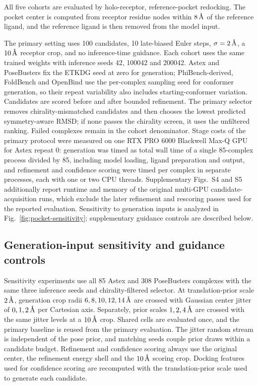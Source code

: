 \documentclass{article}
\newcommand{\angstrom}{\text{\normalfont\AA}}
\begin{document}
All five cohorts are evaluated by holo-receptor, reference-pocket redocking.
The pocket center is computed from receptor residue nodes within \(8\,\angstrom\) of the reference ligand, and the reference ligand is then removed from the model input.

The primary setting uses 100 candidates, 10 late-biased Euler steps, \(\sigma=2\,\angstrom\), a \(10\,\angstrom\) receptor crop, and no inference-time guidance.
Each cohort uses the same trained weights with inference seeds 42, 100042 and 200042. Astex and PoseBusters fix the ETKDG seed at zero for generation; PhiBench-derived, FoldBench and OpenBind use the per-complex sampling seed for conformer generation, so their repeat variability also includes starting-conformer variation.
Candidates are scored before and after bounded refinement.
The primary selector removes chirality-mismatched candidates and then chooses the lowest predicted symmetry-aware RMSD; if none passes the chirality screen, it uses the unfiltered ranking.
Failed complexes remain in the cohort denominator.
Stage costs of the primary protocol were measured on one RTX PRO 6000 Blackwell Max-Q GPU for Astex repeat 0: generation was timed as total wall time of a single 85-complex process divided by 85, including model loading, ligand preparation and output, and refinement and confidence scoring were timed per complex in separate processes, each with one or two CPU threads. Supplementary Figs.~S4 and S5 additionally report runtime and memory of the original multi-GPU candidate-acquisition runs, which exclude the later refinement and rescoring passes used for the reported evaluation. Sensitivity to generation inputs is analyzed in Fig.~\ref{fig:pocket-sensitivity}; supplementary guidance controls are described below.

\subsection{Generation-input sensitivity and guidance controls}

Sensitivity experiments use all 85 Astex and 308 PoseBusters complexes with the same three inference seeds and chirality-filtered selector. At translation-prior scale \(2\,\angstrom\), generation crop radii \(6,8,10,12,14\,\angstrom\) are crossed with Gaussian center jitter of \(0,1,2\,\angstrom\) per Cartesian axis. Separately, prior scales \(1,2,4\,\angstrom\) are crossed with the same jitter levels at a \(10\,\angstrom\) crop. Shared cells are evaluated once, and the primary baseline is reused from the primary evaluation. The jitter random stream is independent of the pose prior, and matching seeds couple prior draws within a candidate budget. Refinement and confidence scoring always use the original center, the refinement energy shell and the \(10\,\angstrom\) scoring crop. Docking features used for confidence scoring are recomputed with the translation-prior scale used to generate each candidate.
\end{document}
